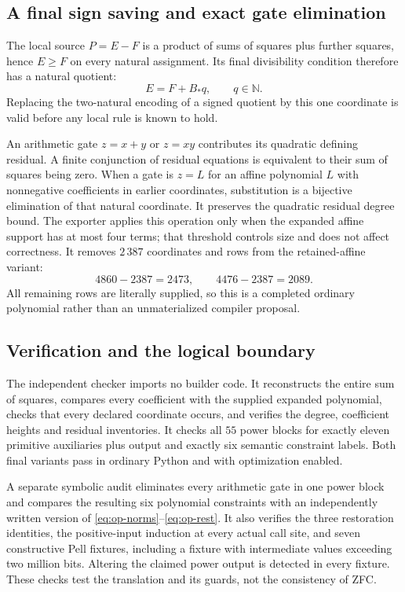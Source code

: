 \subsection{A final sign saving and exact gate elimination}

The local source $P=E-F$ is a product of sums of squares plus further
squares, hence $E\ge F$ on every natural assignment. Its final
divisibility condition therefore has a natural quotient:
\[
 E=F+B_*q,\qquad q\in\mathbb N.
\]
Replacing the two-natural encoding of a signed quotient by this one
coordinate is valid before any local rule is known to hold.

An arithmetic gate $z=x+y$ or $z=xy$ contributes its quadratic
defining residual. A finite conjunction of residual equations is
equivalent to their sum of squares being zero. When a gate is
$z=L$ for an affine polynomial $L$ with nonnegative coefficients in
earlier coordinates, substitution is a bijective elimination of that
natural coordinate. It preserves the quadratic residual degree bound.
The exporter applies this operation only when the expanded affine
support has at most four terms; that threshold controls size and
does not affect correctness. It removes $2\,387$ coordinates and
rows from the retained-affine variant:
\[
 4860-2387=2473,\qquad 4476-2387=2089.
\]
All remaining rows are literally supplied, so this is a completed
ordinary polynomial rather than an unmaterialized compiler proposal.

\subsection{Verification and the logical boundary}

The independent checker imports no builder code. It reconstructs the
entire sum of squares, compares every coefficient with the supplied
expanded polynomial, checks that every declared coordinate occurs,
and verifies the degree, coefficient heights and residual inventories.
It checks all $55$ power blocks for exactly eleven primitive auxiliaries
plus output and exactly six semantic constraint labels. Both final
variants pass in ordinary Python and with optimization enabled.

A separate symbolic audit eliminates every arithmetic gate in one
power block and compares the resulting six polynomial constraints
with an independently written version of
\eqref{eq:op-norms}--\eqref{eq:op-rest}. It also verifies the three
restoration identities, the positive-input induction at every actual
call site, and seven constructive Pell fixtures, including a fixture
with intermediate values exceeding two million bits. Altering the
claimed power output is detected in every fixture. These checks test
the translation and its guards, not the consistency of ZFC.


